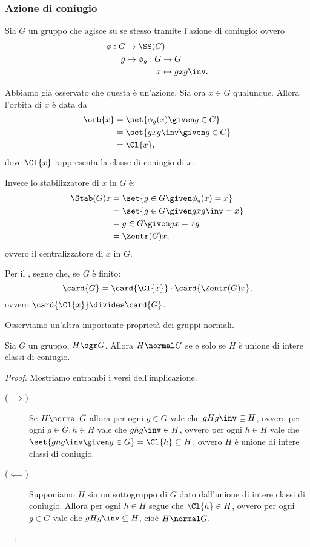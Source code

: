 \subsubsection{Azione di coniugio}
Sia $G$ un gruppo che agisce su se stesso tramite l'azione di coniugio: ovvero \begin{align*}
    \phi : G &\to \SS(G)\\
           g &\mapsto 
    \begin{alignedat}[t]{1}
        \phi_g : G &\to G\\
                 x &\mapsto gxg\inv.
    \end{alignedat}
\end{align*}

Abbiamo già osservato che questa è un'azione. Sia ora $x \in G$ qualunque. Allora l'orbita di $x$ è data da
\begin{align*}
    \orb{x} 
    &= \set{\phi_g(x) \given g \in G}\\
    &= \set{gxg\inv \given g \in G}\\
    &= \Cl{x},
\end{align*}
dove $\Cl{x}$ rappresenta la classe di coniugio di $x$.

Invece lo stabilizzatore di $x$ in $G$ è:
\begin{align*}
    \Stab(G){x} 
    &= \set{g \in G \given \phi_g(x) = x}\\
    &= \set{g \in G \given gxg\inv = x}\\
    &= {g \in G \given gx = xg}\\
    &= \Zentr(G){x},
\end{align*}
ovvero il centralizzatore di $x$ in $G$.

Per il , segue che, se $G$ è finito: \[
    \card{G} = \card{\Cl{x}} \cdot \card{\Zentr(G){x}},  
\] ovvero $\card{\Cl{x}} \divides \card{G}$.

Osserviamo un'altra importante proprietà dei gruppi normali.
\begin{proposition}
    \label{prop:H_normal_iff_union_conj}
    Sia $G$ un gruppo, $H \sgr G$. Allora $H \normal G$ se e solo se $H$ è unione di intere classi di coniugio.
\end{proposition}
\begin{proof}
    Mostriamo entrambi i versi dell'implicazione.
    \begin{description}
        \item[($\implies$)] Se $H \normal G$ allora per ogni $g \in G$ vale che $gHg\inv \subseteq H$, ovvero per ogni $g \in G, h \in H$ vale che $ghg\inv \in H$, ovvero per ogni $h \in H$ vale che $\set{ghg\inv \given g \in G} = \Cl{h} \subseteq H$, ovvero $H$ è unione di intere classi di coniugio.
        \item[($\impliedby$)] Supponiamo $H$ sia un sottogruppo di $G$ dato dall'unione di intere classi di coniugio. Allora per ogni $h \in H$ segue che $\Cl{h} \in H$, ovvero per ogni $g \in G$ vale che $gHg\inv \subseteq H$, cioè $H \normal G$. \qedhere 
    \end{description}
\end{proof}

